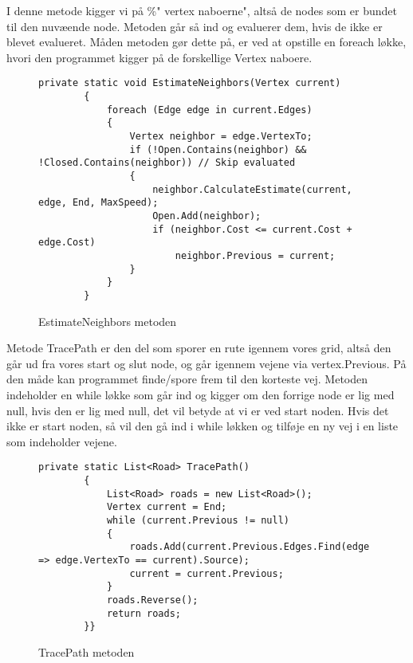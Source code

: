 \vspace{5mm}

I denne metode kigger vi på \%" vertex naboerne", altså de nodes som er bundet til den nuvæende node. Metoden går så ind og evaluerer dem, hvis de ikke er blevet evalueret. Måden metoden gør dette på, er ved at opstille en foreach løkke, hvori den programmet kigger på de forskellige Vertex naboere. 
\begin{figure}[H]
\begin{lstlisting}
private static void EstimateNeighbors(Vertex current)
        {
            foreach (Edge edge in current.Edges)
            {
                Vertex neighbor = edge.VertexTo;
                if (!Open.Contains(neighbor) && !Closed.Contains(neighbor)) // Skip evaluated
                {
                    neighbor.CalculateEstimate(current, edge, End, MaxSpeed); 
                    Open.Add(neighbor);
                    if (neighbor.Cost <= current.Cost + edge.Cost) 
                        neighbor.Previous = current;
                }
            }
        }
\end{lstlisting}
\caption{EstimateNeighbors metoden}\label{EstimateNeighborsCode}
\end{figure}

\vspace{5mm}

Metode TracePath er den del som sporer en rute igennem vores grid, altså den går ud fra vores start og slut node, og går igennem vejene via vertex.Previous. På den måde kan programmet finde/spore frem til den korteste vej. Metoden indeholder en while løkke som går ind og kigger om den forrige node er lig med null, hvis den er lig med null, det vil betyde at vi er ved start noden. Hvis det ikke er start noden, så vil den gå ind i while løkken og tilføje en ny vej i en liste som indeholder vejene.
\begin{figure}[H]
\begin{lstlisting}
private static List<Road> TracePath()
        {
            List<Road> roads = new List<Road>();
            Vertex current = End;
            while (current.Previous != null)              
            { 
                roads.Add(current.Previous.Edges.Find(edge => edge.VertexTo == current).Source);
                current = current.Previous;
            }
            roads.Reverse();
            return roads;
        }}
\end{lstlisting}
\caption{TracePath metoden}\label{TracePathCode}
\end{figure}


